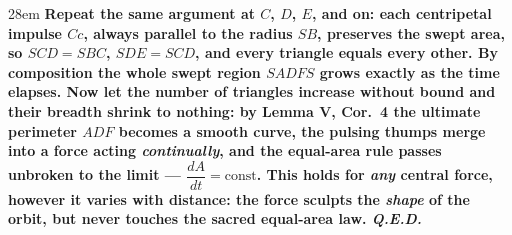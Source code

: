 \documentclass[border=4pt]{standalone}
\begin{document}
\begin{varwidth}{28em}
\large\bfseries
Repeat the same argument at $C$, $D$, $E$, and on: each centripetal impulse $Cc$, always parallel      to the radius $SB$, preserves the swept area, so $SCD = SBC$, $SDE = SCD$, and every triangle equals every      other. By composition the whole swept region $SADFS$ grows exactly as the time elapses. Now let the      number of triangles increase without bound and their breadth shrink to nothing: by \textbf{Lemma V, Cor.~4} the      ultimate perimeter $ADF$ becomes a smooth curve, the pulsing thumps merge into a force acting      \emph{continually}, and the equal-area rule passes unbroken to the limit — $\dfrac{dA}{dt} = \text{const}$.      This holds for \emph{any} central force, however it varies with distance: the force sculpts the \emph{shape} of      the orbit, but never touches the sacred equal-area law. \textit{Q.E.D.}
\end{varwidth}
\end{document}
